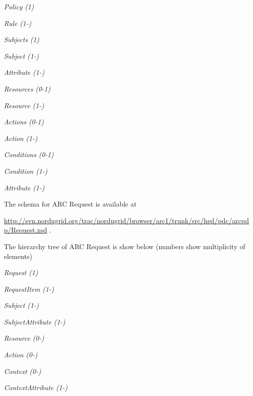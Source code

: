 \documentclass{article}
\begin{document}
{\itshape\color{black}
Policy (1)}

{\itshape\color{black}
 Rule (1-)}

{\itshape\color{black}
  Subjects (1)}

{\itshape\color{black}
   Subject (1-)}

{\itshape\color{black}
    Attribute (1-)}

{\itshape\color{black}
   Resources (0-1)}

{\itshape\color{black}
   Resource (1-)}

{\itshape\color{black}
  Actions (0-1)}

{\itshape\color{black}
   Action (1-)}

{\itshape\color{black}
  Conditions (0-1)}

{\itshape\color{black}
   Condition (1-)}

{\itshape\color{black}
    Attribute (1-)}

{\upshape\color{black}
The schema for ARC Request is available at \ }

{\upshape\color{black}
\url{http://svn.nordugrid.org/trac/nordugrid/browser/arc1/trunk/src/hed/pdc/arcpdp/Request.xsd}
.}

{\upshape\color{black}
The hierarchy tree of ARC Request is show below (numbers show
multiplicity of elements)}

{\itshape\color{black}
Request (1)}

{\itshape\color{black}
 RequestItem (1-)}

{\itshape\color{black}
  Subject (1-)}

{\itshape\color{black}
   SubjectAttribute (1-)}

{\itshape\color{black}
  Resource (0-)}

{\itshape\color{black}
  Action (0-)}

{\itshape\color{black}
  Context (0-)}

{\itshape\color{black}
   ContextAttribute (1-)}
\end{document}
